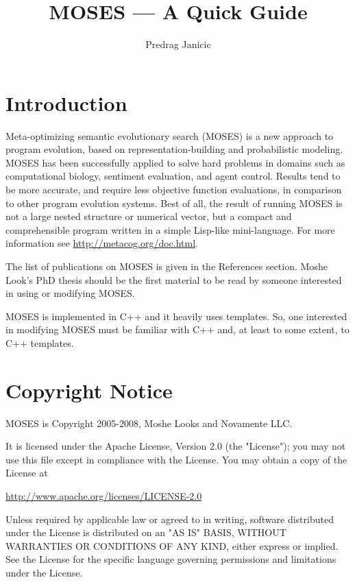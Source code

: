 \documentclass{article}
\title{MOSES --- A Quick Guide}
\author{Predrag Janicic}
\begin{document}
\maketitle

\tableofcontents

\newpage

\section{Introduction}

Meta-optimizing semantic evolutionary search (MOSES) is a new approach to
program evolution, based on representation-building and probabilistic
modeling. MOSES has been successfully applied to solve hard problems in domains
such as computational biology, sentiment evaluation, and agent control. Results
tend to be more accurate, and require less objective function evaluations, in
comparison to other program evolution systems. Best of all, the result of
running MOSES is not a large nested structure or numerical vector, but a
compact and comprehensible program written in a simple Lisp-like
mini-language. For more information see \url{http://metacog.org/doc.html}.

The list of publications on MOSES is given in the References section.
Moshe Look's PhD thesis \cite{6} should be the first material to be read
by someone interested in using or modifying MOSES.

MOSES is implemented in C++ and it heavily uses templates. So, one interested 
in modifying MOSES must be familiar with C++ and, at least to some extent, to 
C++ templates.


\section{Copyright Notice}

MOSES is Copyright 2005-2008, Moshe Looks and Novamente LLC.

It is licensed under the Apache License, Version 2.0 (the "License");
you may not use this file except in compliance with the License.
You may obtain a copy of the License at

\url{http://www.apache.org/licenses/LICENSE-2.0}

Unless required by applicable law or agreed to in writing, software
distributed under the License is distributed on an "AS IS" BASIS,
WITHOUT WARRANTIES OR CONDITIONS OF ANY KIND, either express or implied.
See the License for the specific language governing permissions and
limitations under the License.
\end{document}
